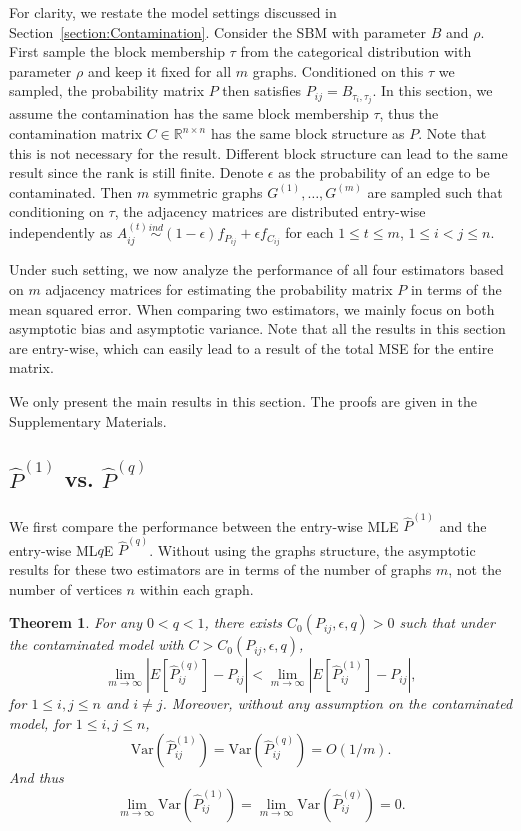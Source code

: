 \documentclass[a4paper]{article}
\newtheorem{theorem}[fact]{Theorem}
\renewcommand{\hat}{\widehat}
\begin{document}
For clarity, we restate the model settings discussed in Section~\ref{section:Contamination}. Consider the SBM with parameter $B$ and $\rho$. First sample the block membership $\tau$ from the categorical distribution with parameter $\rho$ and keep it fixed for all $m$ graphs. Conditioned on this $\tau$ we sampled, the probability matrix $P$ then satisfies $P_{ij} = B_{\tau_i, \tau_j}$. In this section, we assume the contamination has the same block membership $\tau$, thus the contamination matrix $C \in \mathbb{R}^{n \times n}$ has the same block structure as $P$. Note that this is not necessary for the result. Different block structure can lead to the same result since the rank is still finite. Denote $\epsilon$ as the probability of an edge to be contaminated. Then $m$ symmetric graphs $G^{(1)}, \dotsc, G^{(m)}$  are sampled such that conditioning on $\tau$, the adjacency matrices are distributed entry-wise independently as $A^{(t)}_{ij} \stackrel{ind}{\sim} (1-\epsilon) f_{P_{ij}} + \epsilon f_{C_{ij}}$ for each $1 \le t \le m$, $1 \le i < j \le n$. 

Under such setting, we now analyze the performance of all four estimators based on $m$ adjacency matrices for estimating the probability matrix $P$ in terms of the mean squared error. When comparing two estimators, we mainly focus on both asymptotic bias and asymptotic variance. Note that all the results in this section are entry-wise, which can easily lead to a result of the total MSE for the entire matrix.

We only present the main results in this section. The proofs are given in the Supplementary Materials.

\subsection{$\hat{P}^{(1)}$ vs. $\hat{P}^{(q)}$}
\label{section:MLEvsMLqE}
We first compare the performance between the entry-wise MLE $\hat{P}^{(1)}$ and the entry-wise ML$q$E $\hat{P}^{(q)}$. Without using the graphs structure, the asymptotic results for these two estimators are in terms of the number of graphs $m$, not the number of vertices $n$ within each graph.



\begin{theorem}
\label{thm:MLEvsMLqE}
For any $0 < q < 1$, there exists $C_0(P_{ij}, \epsilon, q) > 0$ such that under the contaminated model with $C > C_0(P_{ij}, \epsilon, q)$,
\[
	\lim_{m \to \infty} \left| E[\hat{P}^{(q)}_{ij}] - P_{ij} \right| < 
    \lim_{m \to \infty} \left| E[\hat{P}^{(1)}_{ij}] - P_{ij} \right|,
\]
for $1 \le i, j \le n$ and $i \ne j$.
Moreover, without any assumption on the contaminated model, for $1 \le i, j \le n$, 
\[
	\mathrm{Var}(\hat{P}^{(1)}_{ij})
    = \mathrm{Var}(\hat{P}^{(q)}_{ij}) = O(1/m).
\]
And thus
\[
	\lim_{m \to \infty} \mathrm{Var}(\hat{P}^{(1)}_{ij})
    = \lim_{m \to \infty} \mathrm{Var}(\hat{P}^{(q)}_{ij}) = 0.
\]
\end{theorem}
\end{document}
